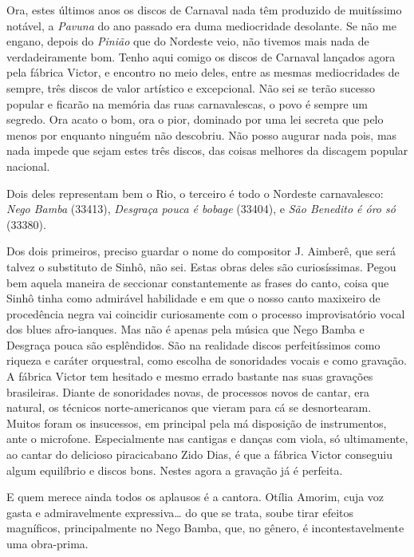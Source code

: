 Ora, estes últimos anos os discos de Carnaval nada têm produzido de
muitíssimo notável, a \emph{Pavuna} do ano passado era duma mediocridade
desolante. Se não me engano, depois do \emph{Pinião} que do Nordeste
veio, não tivemos mais nada de verdadeiramente bom. Tenho aqui comigo os
discos de Carnaval lançados agora pela fábrica Victor, e encontro no
meio deles, entre as mesmas mediocridades de sempre, três discos de
valor artístico e excepcional. Não sei se terão sucesso popular e
ficarão na memória das ruas carnavalescas, o povo é sempre um segredo.
Ora acato o bom, ora o pior, dominado por uma lei secreta que pelo menos
por enquanto ninguém não descobriu. Não posso augurar nada pois, mas
nada impede que sejam estes três discos, das coisas melhores da discagem
popular nacional.

Dois deles representam bem o Rio, o terceiro é todo o Nordeste
carnavalesco: \emph{Nego Bamba} (33413), \emph{Desgraça pouca é bobage}
(33404), e \emph{São Benedito é óro só} (33380).

Dos dois primeiros, preciso guardar o nome do compositor J. Aimberê, que
será talvez o substituto de Sinhô, não sei. Estas obras deles são
curiosíssimas. Pegou bem aquela maneira de seccionar constantemente as
frases do canto, coisa que Sinhô tinha como admirável habilidade e em
que o nosso canto maxixeiro de procedência negra vai coincidir
curiosamente com o processo improvisatório vocal dos blues afro-ianques.
Mas não é apenas pela música que Nego Bamba e Desgraça pouca são
esplêndidos. São na realidade discos perfeitíssimos como riqueza e
caráter orquestral, como escolha de sonoridades vocais e como gravação.
A fábrica Victor tem hesitado e mesmo errado bastante nas suas gravações
brasileiras. Diante de sonoridades novas, de processos novos de cantar,
era natural, os técnicos norte-americanos que vieram para cá se
desnortearam. Muitos foram os insucessos, em principal pela má
disposição de instrumentos, ante o microfone. Especialmente nas cantigas
e danças com viola, só ultimamente, ao cantar do delicioso piracicabano
Zido Dias, é que a fábrica Victor conseguiu algum equilíbrio e discos
bons. Nestes agora a gravação já é perfeita.

E quem merece ainda todos os aplausos é a cantora. Otília Amorim, cuja
voz gasta e admiravelmente expressiva\ldots{} do que se trata, soube tirar
efeitos magníficos, principalmente no Nego Bamba, que, no gênero, é
incontestavelmente uma obra-prima.

